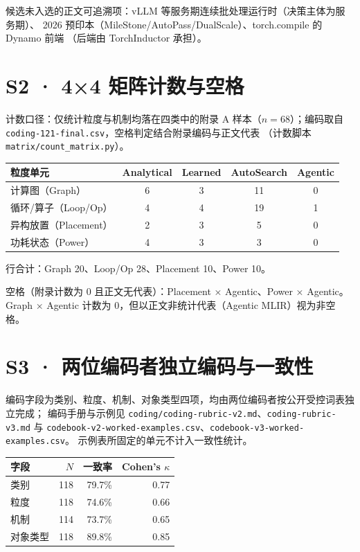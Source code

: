 \documentclass[11pt,a4paper]{article}
\begin{document}
候选未入选的正文可追溯项：vLLM 等服务期连续批处理运行时（决策主体为服务期）、
2026 预印本（MileStone/AutoPass/DualScale）、torch.compile 的 Dynamo 前端
（后端由 TorchInductor 承担）。

\section{S2 · 4×4 矩阵计数与空格}
计数口径：仅统计粒度与机制均落在四类中的附录 A 样本（$n=68$）；编码取自
\texttt{coding-121-final.csv}，空格判定结合附录编码与正文代表
（计数脚本 \texttt{matrix/count\_matrix.py}）。

\begin{center}
\begin{tabular}{lcccc}
\toprule
粒度单元 & Analytical & Learned & AutoSearch & Agentic \\
\midrule
计算图（Graph） & 6 & 3 & 11 & 0 \\
循环/算子（Loop/Op） & 4 & 4 & 19 & 1 \\
异构放置（Placement） & 2 & 3 & 5 & 0 \\
功耗状态（Power） & 4 & 3 & 3 & 0 \\
\bottomrule
\end{tabular}
\end{center}

行合计：Graph 20、Loop/Op 28、Placement 10、Power 10。

空格（附录计数为 0 且正文无代表）：Placement × Agentic、Power × Agentic。
Graph × Agentic 计数为 0，但以正文非统计代表（Agentic MLIR）视为非空格。

\section{S3 · 两位编码者独立编码与一致性}
编码字段为类别、粒度、机制、对象类型四项，均由两位编码者按公开受控词表独立完成；
编码手册与示例见 \texttt{coding/coding-rubric-v2.md}、\texttt{coding-rubric-v3.md} 与
\texttt{codebook-v2-worked-examples.csv}、\texttt{codebook-v3-worked-examples.csv}。
示例表所固定的单元不计入一致性统计。

\begin{center}
\begin{tabular}{lrrr}
\toprule
字段 & $N$ & 一致率 & Cohen's $\kappa$ \\
\midrule
类别 & 118 & 79.7\% & 0.77 \\
粒度 & 118 & 74.6\% & 0.66 \\
机制 & 114 & 73.7\% & 0.65 \\
对象类型 & 118 & 89.8\% & 0.85 \\
\bottomrule
\end{tabular}
\end{center}
\end{document}
